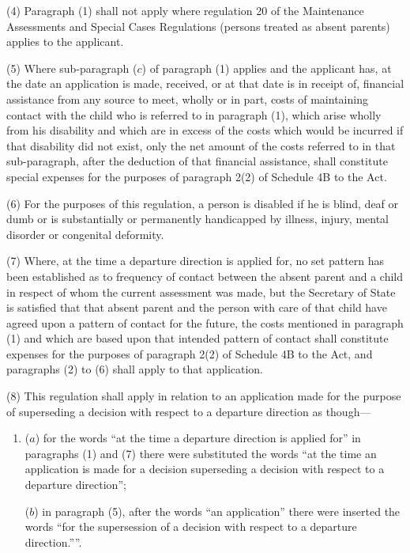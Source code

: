\documentclass[12pt,a4paper]{article}
\begin{document}
(4) Paragraph (1) shall not apply where regulation 20 of the Maintenance
Assessments and Special Cases Regulations (persons treated as absent parents)
applies to the applicant.

(5) Where sub-paragraph ($c$) of paragraph (1) applies and the applicant has, at
the date an application is made, received, or at that date is in receipt of,
financial assistance from any source to meet, wholly or in part, costs of
maintaining contact with the child who is referred to in paragraph (1), which
arise wholly from his disability and which are in excess of the costs which
would be incurred if that disability did not exist, only the net amount of the
costs referred to in that sub-paragraph, after the deduction of that financial
assistance, shall constitute special expenses for the purposes of paragraph 2(2)
of Schedule 4B to the Act.

(6) For the purposes of this regulation, a person is disabled if he is blind,
deaf or dumb or is substantially or permanently handicapped by illness, injury,
mental disorder or congenital deformity.

(7) Where, at the time a departure direction is applied for, no set pattern has
been established as to frequency of contact between the absent parent and a
child in respect of whom the current assessment was made, but the Secretary of
State is satisfied that that absent parent and the person with care of that
child have agreed upon a pattern of contact for the future, the costs mentioned
in paragraph (1) and which are based upon that intended pattern of contact shall
constitute expenses for the purposes of paragraph 2(2) of Schedule 4B to the
Act, and paragraphs (2) to (6) shall apply to that application.

(8) This regulation shall apply in relation to an application made for the purpose of superseding a decision with respect to a departure direction as though---
\begin{enumerate}\item[]
($a$) for the words “at the time a departure direction is applied for” in paragraphs (1) and (7) there were substituted the words “at the time an application is made for a decision superseding a decision with respect to a departure direction”;

($b$) in paragraph (5), after the words “an application” there were inserted the words “for the supersession of a decision with respect to a departure direction.””.
\end{enumerate}
\end{document}
